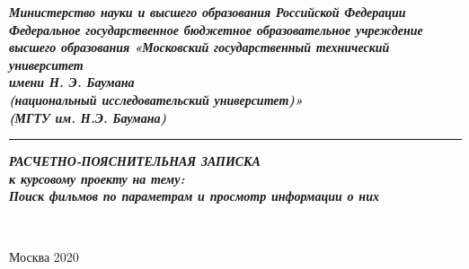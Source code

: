 \documentclass[a4paper, 14pt]{article}
\begin{document}
	\thispagestyle{empty}
 	\begin{center}
 		\hfill \break
 		\textit{
 			\normalsize {\bf  Министерство науки и высшего образования Российской Федерации}\\
 			\normalsize {\bf Федеральное государственное бюджетное образовательное учреждение }\\
 			\normalsize {\bf  высшего  образования}
 			\normalsize  {\bf  «Московский государственный технический университет}\\ 
 			\normalsize  {\bf имени Н. Э. Баумана}\\
 			\normalsize  {\bf (национальный исследовательский университет)»}\\
 			\normalsize  {\bf (МГТУ им. Н.Э. Баумана)}\\
 		}
 		\noindent\rule{\textwidth}{2pt}
 		\hfill \break
 		\hfill\break
 		\hfill\break
 		\hfill\break
 		\hfill\break
 		\hfill\break
 		\hfill\break
 		\hfill \break
 		\hfill \break
 		\textit{
 			\normalsize {\bf РАСЧЕТНО-ПОЯСНИТЕЛЬНАЯ ЗАПИСКА}\\
 			\normalsize {\bf к курсовому проекту на тему:}\\
 			\normalsize {\bf  Поиск фильмов по параметрам и просмотр информации о них} \\
 		}
 		\hfill \break
 		\hfill \break
 		\hfill \break
 		\hfill \break
 		\hfill \break
 		\hfill \break
 		\hfill \break
 		\hfill \break
 		\hfill \break
 		\hfill \break
 		\hfill \break
 		
 		\hfill \break
 		\normalsize {
 			\noindent
 			\makebox[\textwidth][c]{}%
 		}\\
 		\hfill \break
 		\hfill \break
 		\normalsize {
 			\noindent
 			\makebox[\textwidth][c]{}%
 		}
 		\hfill \break
 		\hfill \break
 		\hfill \break
 		\hfill \break\hfill \break
 		\hfill \break
 	\end{center}
 	\hfill \break
 	\hfill \break
 	\hfill \break
 	\hfill \break
 	\begin{center} Москва 2020\end{center}
	\newpage
	
	\tableofcontents
	
\end{document}
